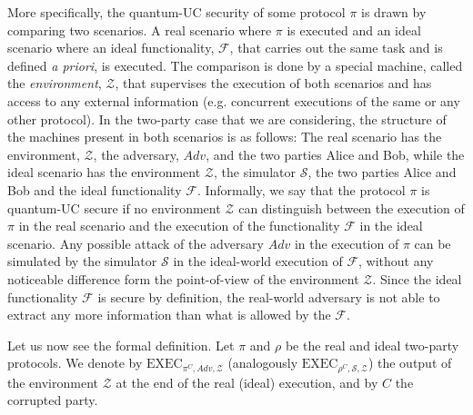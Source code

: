 More specifically, the quantum-UC security of some protocol $\mathcal{\pi}$ is drawn by comparing two scenarios. A real scenario where  $\mathcal{\pi}$ is executed and an ideal scenario where an ideal functionality, $\mathcal{F}$,  that carries out the same task and is defined \textit{a priori}, is executed. The comparison is done by a special machine, called the \textit{environment}, $\mathcal{Z}$, that supervises the execution of both scenarios and has access to any external information (e.g. concurrent executions of the same or any other protocol). In the two-party case that we are considering, the structure of the machines present in both scenarios is as follows: The real scenario has the environment, $\mathcal{Z}$, the adversary, $Adv$, and the two parties Alice  and Bob, while the ideal scenario has the environment $\mathcal{Z}$, the simulator $\mathcal{S}$, the two parties Alice and Bob and the ideal functionality $\mathcal{F}$. 
Informally, we say that the protocol $\mathcal{\pi}$ is quantum-UC secure if no environment $\mathcal{Z}$ can distinguish between the execution of $\mathcal{\pi}$ in the real scenario and  the execution of the  functionality $\mathcal{F}$ in the ideal scenario. Any possible attack of the adversary $Adv$ in the execution of $\mathcal{\pi}$ can be simulated by the simulator $\mathcal{S}$ in the ideal-world execution of $\mathcal{F}$, without any noticeable difference form the point-of-view of the environment $\mathcal{Z}$. Since the ideal functionality $\mathcal{F}$ is secure by definition, the real-world adversary is not able to extract any more information than what is allowed by the  $\mathcal{F}$. %

Let us now see the formal definition. Let $\mathcal{\pi}$ and $\rho$ be the real and ideal two-party protocols. We denote by $\text{EXEC}_{\mathcal{\pi}^C, Adv, \mathcal{Z}}$ (analogously $\text{EXEC}_{\rho^C, \mathcal{S}, \mathcal{Z}}$) the output of the environment $\mathcal{Z}$ at the end of the real (ideal) execution, and by $C$ the corrupted party. 

